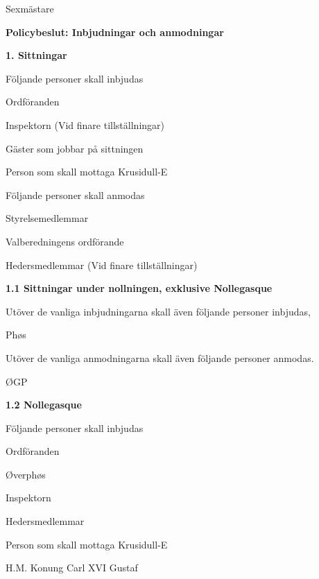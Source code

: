 \documentclass[../_main/handlingar.tex]{subfiles}
\begin{document}
\begin{signatures}{1}
    \ist
    \signature{\sexm}{Sexmästare}
\end{signatures}

\newpage

{\Large \textbf{Policybeslut: Inbjudningar och anmodningar}}

{\large \textbf{1. Sittningar}}

Följande personer skall inbjudas
\begin{dashlist}
    \item Ordföranden
    \item Inspektorn (Vid finare tillställningar) 
    \item Gäster som jobbar på sittningen 
    \item Person som skall mottaga Krusidull-E
    
\end{dashlist}
Följande personer skall anmodas
\begin{dashlist}
    \item Styrelsemedlemmar
    \item Valberedningens ordförande
    \item Hedersmedlemmar (Vid finare tillställningar) 
\end{dashlist}

{\large \textbf{1.1 Sittningar under nollningen, exklusive Nollegasque}}

Utöver de vanliga inbjudningarna skall även följande personer inbjudas, 
\begin{dashlist}
    \item Phøs
\end{dashlist}
Utöver de vanliga anmodningarna skall även följande personer anmodas. 
\begin{dashlist}
    \item ØGP
\end{dashlist}

{\large \textbf{1.2 Nollegasque}}

Följande personer skall inbjudas
    \begin{dashlist}
        \item Ordföranden
        \item Øverphøs
        \item Inspektorn
        \item Hedersmedlemmar
        \item Person som skall mottaga Krusidull-E
        \item H.M. Konung Carl XVI Gustaf
    \end{dashlist}
\end{document}
